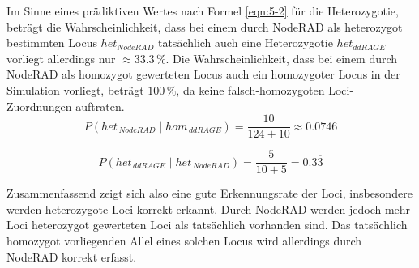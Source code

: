 Im Sinne eines prädiktiven Wertes nach Formel \eqref{eqn:5-2} für die Heterozygotie, beträgt die Wahrscheinlichkeit, dass bei einem durch NodeRAD als heterozygot bestimmten Locus $het_{NodeRAD}$ tatsächlich auch eine Heterozygotie $het_{ddRAGE}$ vorliegt allerdings nur $ \approx 33.\overline{3}\, \% $. Die Wahrscheinlichkeit, dass bei einem durch NodeRAD als homozygot gewerteten Locus auch ein homozygoter Locus in der Simulation vorliegt, beträgt $100\, \%$, da keine falsch-homozygoten Loci-Zuordnungen auftraten.\\

\begin{equation} \label{eqn:5-1}
\tag{5-1}
P(het_{\, NodeRAD} \; | \; hom_{\, ddRAGE}) = \frac{10}{124+10} \approx 0.0746
\end{equation}

\begin{equation} \label{eqn:5-2}
\tag{5-2}
P(het_{\, ddRAGE} \; | \; het_{\, NodeRAD}) = \frac{5}{10+5} = 0.3 \overline{3}
\end{equation}

Zusammenfassend zeigt sich also eine gute Erkennungsrate der Loci, insbesondere werden heterozygote Loci korrekt erkannt. Durch NodeRAD werden jedoch mehr Loci heterozygot gewerteten Loci als tatsächlich vorhanden sind. Das tatsächlich homozygot vorliegenden Allel eines solchen Locus wird allerdings durch NodeRAD korrekt erfasst. 

\let\cleardoublepage\clearpage